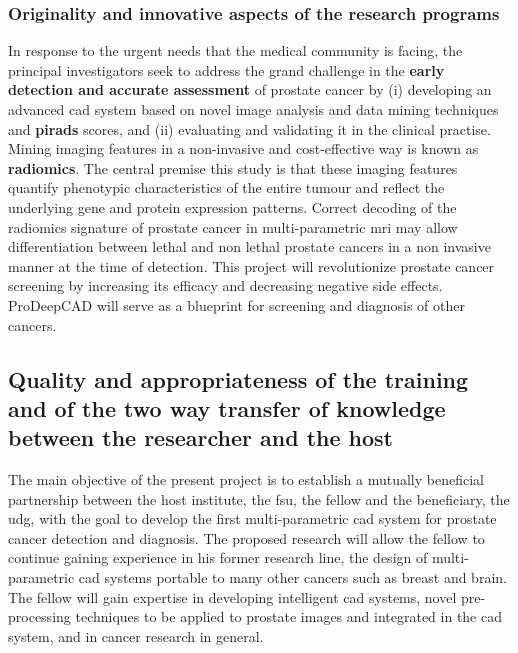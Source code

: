 \subsubsection{Originality and innovative aspects of the research programs}

In response to the urgent needs that the medical community is facing, the principal investigators seek to address the grand challenge in the \textbf{early detection and accurate assessment} of prostate cancer by (i) developing an advanced \ac{cad} system based on novel image analysis and data mining techniques and \textbf{\ac{pirads}} scores, and (ii) evaluating and validating it in the clinical practise. 
Mining imaging features in a non-invasive and cost-effective way is known as \textbf{radiomics}.
The central premise this study is that these imaging features quantify phenotypic characteristics of the entire tumour and reflect the underlying gene and protein expression patterns.
Correct decoding of the radiomics signature of prostate cancer in multi-parametric \ac{mri} may allow differentiation between lethal and non lethal prostate cancers in a non invasive manner at the time of detection. 
This project will revolutionize prostate cancer screening by increasing its efficacy and decreasing negative side effects.
ProDeepCAD will serve as a blueprint for screening and diagnosis of other cancers.

\subsection{Quality and appropriateness of the training and of the two way transfer of knowledge between the researcher and the host}
\label{sec:transfer}

The main objective of the present project is to establish a mutually beneficial partnership between the host institute, the \ac{fsu}, the fellow and the beneficiary, the \ac{udg}, with the goal to develop the first multi-parametric \ac{cad} system for prostate cancer detection and diagnosis.
The proposed research will allow the fellow to continue gaining experience in his former research line, the design of multi-parametric \ac{cad} systems portable to many other cancers such as breast and brain.
The fellow will gain expertise in developing intelligent \ac{cad} systems, novel pre-processing techniques to be applied to prostate images and integrated in the \ac{cad} system, and in cancer research in general.

